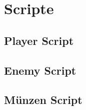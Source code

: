 \pagebreak
\chapter{Scripte}

\section{Player Script}

\section{Enemy Script}

\section{Münzen Script}